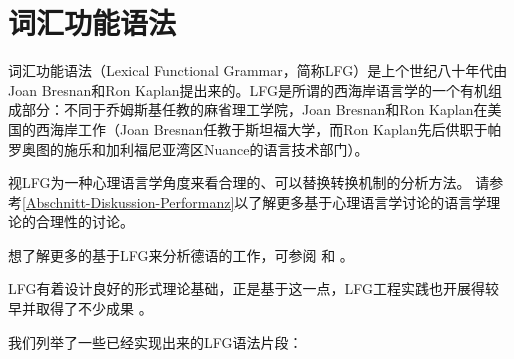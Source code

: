 
\chapter{词汇功能语法}
\label{Kapitel-LFG}

词汇功能语法（Lexical Functional Grammar，简称LFG）是上个世纪八十年代由Joan Bresnan和Ron Kaplan提出来的\citep{BK82a}。LFG是所谓的西海岸语言学的一个有机组成部分：不同于乔姆斯基任教的麻省理工学院，Joan Bresnan和Ron Kaplan在美国的西海岸工作（Joan Bresnan任教于斯坦福大学，而Ron Kaplan先后供职于帕罗奥图的施乐和加利福尼亚湾区Nuance的语言技术部门）。

 \citet{BK82a}视LFG为一种心理语言学角度来看合理的、可以替换转换机制的分析方法。
请参考\ref{Abschnitt-Diskussion-Performanz}以了解更多基于心理语言学讨论的语言学理论的合理性的讨论。 

想了解更多的基于LFG来分析德语的工作，可参阅 和 。

LFG有着设计良好的形式理论基础\citep{KB82a-u,Kaplan95a}，正是基于这一点，LFG工程实践也开展得较早并取得了不少成果
\citep*{FR83b,FR83a,Yasukawa1984a-u,BH86a-u,%
ED86a-u,%
WA86a-u,%
Delmonte90a-u,%
HHP91a-u,%
Kohl92a-u,KGPRM92a-u,%
KM96a-u,%
Mayo97a-u,Mayo99a-u,%
BS2005b-u,BSagot2005a-u,%
Clement2009a-u,CK2001a-u%
}。

我们列举了一些已经实现出来的LFG语法片段：

